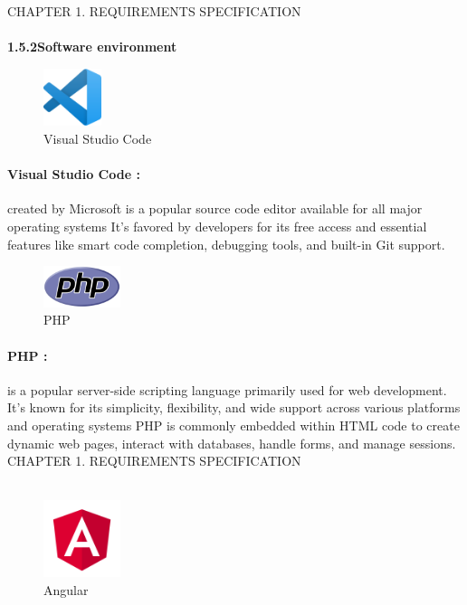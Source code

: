 \documentclass{article}
\begin{document}
\newpage
\noindent
CHAPTER 1.  REQUIREMENTS SPECIFICATION \\
\underline{\hspace{\textwidth}} \vspace{0.2cm}\\
{\large \textbf{1.5.2\hspace{1em}Software environment}}\vspace{0.2cm}
\begin{figure}[htbp]
    \centering
    \includegraphics[width=0.15\textwidth]{ddd}
    \caption{Visual Studio Code}
    \label{fig:design1}
\end{figure}

\paragraph{Visual Studio Code :} 
created by Microsoft is a popular source code editor available for all major operating systems It's favored by developers for its free access and essential features like smart code completion, debugging tools, and built-in Git support.

\vspace{1cm}

\begin{figure}[htbp]
    \centering
    \includegraphics[width=0.2\textwidth]{eee}
    \caption{PHP}
    \label{fig:design2}
\end{figure}

\paragraph{PHP :} 
is a popular server-side scripting language primarily used for web development. It's known for its simplicity, flexibility, and wide support across various platforms and operating systems PHP is commonly embedded within HTML code to create dynamic web pages, interact with databases, handle forms, and manage sessions.
\vspace{1cm}
\newpage
\noindent
CHAPTER 1.  REQUIREMENTS SPECIFICATION \\
\underline{\hspace{\textwidth}} \vspace{0.2cm}\\
\begin{figure}[htbp]
    \centering
    \includegraphics[width=0.2\textwidth]{ccc}
    \caption{Angular}
    \label{fig:design3}
\end{figure}
\end{document}

